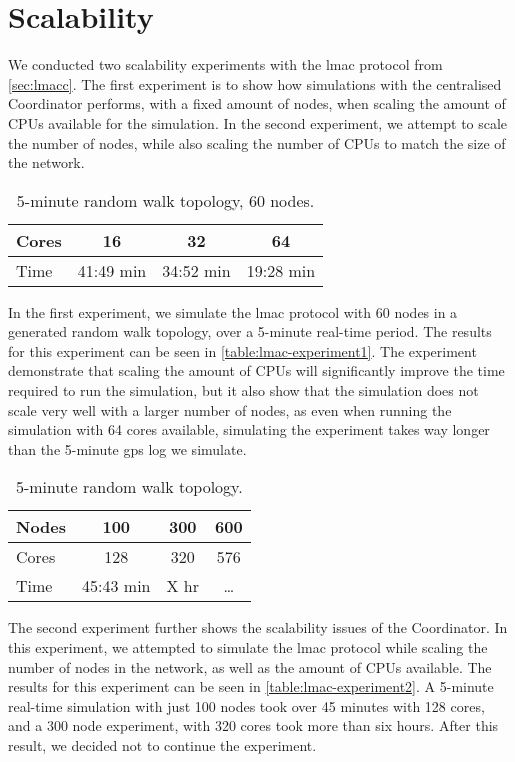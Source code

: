 \section{Scalability}\label{sec:scalability}
We conducted two scalability experiments with the \gls{lmac} protocol from \autoref{sec:lmacc}. The first
experiment is to show how simulations with the centralised Coordinator performs, with a fixed amount of nodes,
when scaling the amount of CPUs available for the simulation. In the second experiment, we attempt to scale
the number of nodes, while also scaling the number of CPUs to match the size of the network.

\begin{table}[H]
    \begin{tabular}{|l|c|c|c|}
        \hline
        Cores & 16        & 32        & 64        \\ \hline
        Time  & 41:49 min & 34:52 min & 19:28 min \\ \hline
    \end{tabular}
    \caption{5-minute random walk topology, 60 nodes.}\label{table:lmac-experiment1}
\end{table}

In the first experiment, we simulate the \gls{lmac} protocol with 60 nodes in a generated random walk
topology, over a 5-minute real-time period. The results for this experiment can be seen in
\autoref{table:lmac-experiment1}. The experiment demonstrate that scaling the amount of CPUs will
significantly improve the time required to run the simulation, but it also show that the simulation does not
scale very well with a larger number of nodes, as even when running the simulation with 64 cores available,
simulating the experiment takes way longer than the 5-minute \gls{gps} log we simulate.

\begin{table}[H]
    \begin{tabular}{|l|c|c|c|}
        \hline
        Nodes & 100       & 300  & 600   \\ \hline
        Cores & 128       & 320  & 576   \\ \hline
        Time  & 45:43 min & X hr & \dots \\ \hline
    \end{tabular}
    \caption{5-minute random walk topology.}\label{table:lmac-experiment2}
\end{table}
The second experiment further shows the scalability issues of the Coordinator. In this experiment, we
attempted to simulate the \gls{lmac} protocol while scaling the number of nodes in the network, as well as the
amount of CPUs available. The results for this experiment can be seen in \autoref{table:lmac-experiment2}. A
5-minute real-time simulation with just 100 nodes took over 45 minutes with 128 cores, and a 300 node
experiment, with 320 cores took more than six hours. After this result, we decided not to continue the
experiment.

